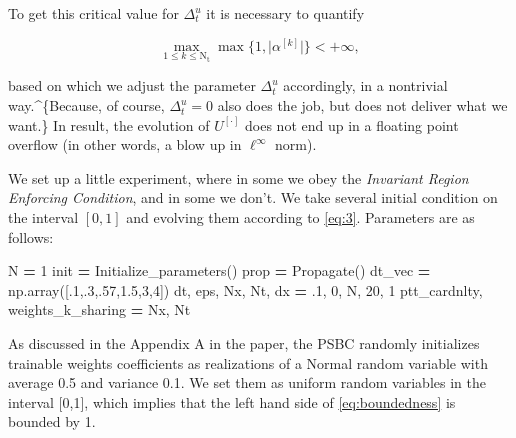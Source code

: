 \documentclass[openany,twoside]{book}
\newenvironment{Shaded}{\begin{snugshade}}{\end{snugshade}}
\newcommand{\DecValTok}[1]{\textcolor[rgb]{0.00,0.00,0.81}{#1}}
\newcommand{\FloatTok}[1]{\textcolor[rgb]{0.00,0.00,0.81}{#1}}
\newcommand{\NormalTok}[1]{#1}
\newcommand{\OperatorTok}[1]{\textcolor[rgb]{0.81,0.36,0.00}{\textbf{#1}}}
\begin{document}
To get this critical value for \(\Delta_t^u\) it is necessary to quantify

\begin{equation}
\max_{1\leq k \leq \mathrm{N_t}}\max\{1,\vert \alpha^{[k]}\vert\} <+\infty,\label{eq:boundedness}
\end{equation}

based on which we adjust the parameter \(\Delta_t^u\) accordingly, in a nontrivial way.\^{}\{Because, of course, \(\Delta_t^u =0\) also does the job, but does not deliver what we want.\} In result, the evolution of \(U^{[\cdot]}\) does not end up in a floating point overflow (in other words, a blow up in \(\ell^{\infty}\) norm).

We set up a little experiment, where in some we obey the \emph{Invariant Region Enforcing Condition}, and in some we don't. We take several initial condition on the interval \([0,1]\) and evolving them according to \eqref{eq:3}. Parameters are as follows:

\begin{Shaded}
\begin{Highlighting}[]
\NormalTok{N }\OperatorTok{=} \DecValTok{1}
\NormalTok{init }\OperatorTok{=}\NormalTok{ Initialize_parameters()}
\NormalTok{prop }\OperatorTok{=}\NormalTok{ Propagate()}
\NormalTok{dt_vec }\OperatorTok{=}\NormalTok{ np.array([.}\DecValTok{1}\NormalTok{,.}\DecValTok{3}\NormalTok{,.}\DecValTok{57}\NormalTok{,}\FloatTok{1.5}\NormalTok{,}\DecValTok{3}\NormalTok{,}\DecValTok{4}\NormalTok{])}
\NormalTok{dt, eps, Nx, Nt, dx }\OperatorTok{=} \FloatTok{.1}\NormalTok{, }\DecValTok{0}\NormalTok{, N, }\DecValTok{20}\NormalTok{, }\DecValTok{1}
\NormalTok{ptt_cardnlty, weights_k_sharing }\OperatorTok{=}\NormalTok{ Nx, Nt}
\end{Highlighting}
\end{Shaded}

As discussed in the Appendix A in the paper, the PSBC randomly initializes trainable weights coefficients as realizations of a Normal random variable with average 0.5 and variance 0.1. We set them as uniform random variables in the interval {[}0,1{]}, which implies that the left hand side of \eqref{eq:boundedness} is bounded by 1.
\end{document}
